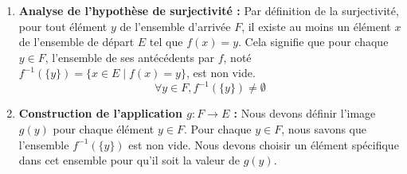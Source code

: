 \documentclass[12pt,a4paper]{report}
\begin{document}
\begin{enumerate}
\def\labelenumi{\arabic{enumi}.}
\item
  \textbf{Analyse de l'hypothèse de surjectivité :} Par définition de la
  surjectivité, pour tout élément \(y\) de l'ensemble d'arrivée \(F\),
  il existe au moins un élément \(x\) de l'ensemble de départ \(E\) tel
  que \(f(x) = y\). Cela signifie que pour chaque \(y \in F\),
  l'ensemble de ses antécédents par \(f\), noté
  \(f^{-1}(\{y\}) = \{x \in E \mid f(x) = y\}\), est non vide. \[
  \forall y \in F, f^{-1}(\{y\}) \neq \emptyset
  \]
\item
  \textbf{Construction de l'application \(g: F \to E\) :} Nous devons
  définir l'image \(g(y)\) pour chaque élément \(y \in F\). Pour chaque
  \(y \in F\), nous savons que l'ensemble \(f^{-1}(\{y\})\) est non
  vide. Nous devons choisir un élément spécifique dans cet ensemble pour
  qu'il soit la valeur de \(g(y)\).


\end{enumerate}
\end{document}
